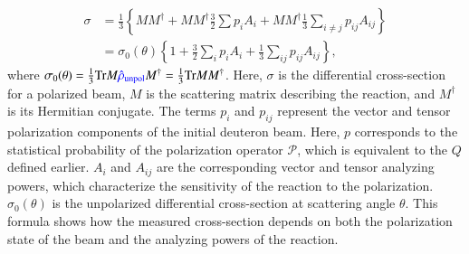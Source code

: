 \documentclass[twocolumn,twoside,showpacs,showkeys,preprintnumbers,superscriptaddress,amsmath,amssymb,prc,nofootinbib,a4paper]{revtex4}
\begin{document}
\begin{align}
    \sigma&= \frac{1}{3} \left\{ MM^\dagger + MM^\dagger \frac{3}{2} \sum p_i A_i   + MM^\dagger \frac{1}{3}\sum_{i \neq j} p_{ij}A_{ij}  \right\} \nonumber\\ 
    &= \sigma_0(\theta) \left\{ 1 + \frac{3}{2} \sum_i p_i A_i  + \frac{1}{3} \sum_{ij} p_{ij} A_{ij}\right\} 
\label{primary_pol_crosssection},
\end{align}
where $\sigma_0(\theta) =\frac{1}{3} {\rm Tr} M \textcolor{blue}{\hat{\rho}_{\rm unpol}} M^\dagger =\frac{1}{3} {\rm Tr} M M^\dagger$.  Here, $\sigma$ is the differential cross-section for a polarized beam, $M$ is the scattering matrix describing the reaction, and $M^\dagger$ is its Hermitian conjugate. The terms $p_i$ and $p_{ij}$ represent the vector and tensor polarization components of the initial deuteron beam. Here, $p$ corresponds to the statistical probability of the polarization operator $\mathscr{P}$, which is equivalent to the $Q$ defined earlier. $A_i$ and $A_{ij}$ are the corresponding vector and tensor analyzing powers, which characterize the sensitivity of the reaction to the polarization. $\sigma_0(\theta)$ is the unpolarized differential cross-section at scattering angle $\theta$. This formula shows how the measured cross-section depends on both the polarization state of the beam and the analyzing powers of the reaction.
\end{document}
